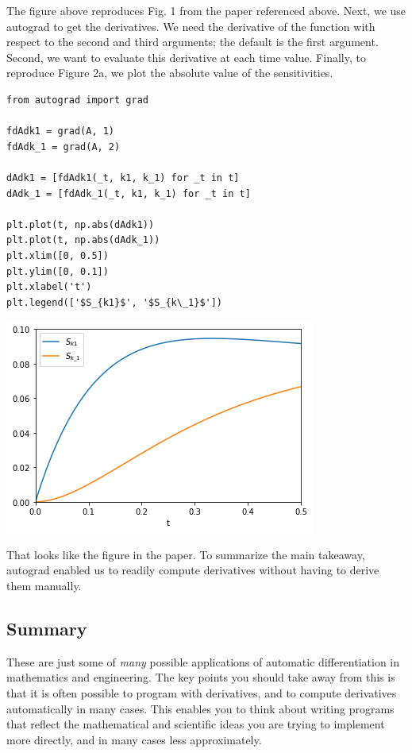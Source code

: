 \documentclass[11pt]{article}
\begin{document}
The figure above reproduces Fig. 1 from the paper referenced above.  Next, we use autograd to get the derivatives. We need the derivative of the function with respect to the second and third arguments; the default is the first argument. Second, we want to evaluate this derivative at each time value.  Finally, to reproduce Figure 2a, we plot the absolute value of the sensitivities.

\begin{verbatim}
from autograd import grad

fdAdk1 = grad(A, 1)
fdAdk_1 = grad(A, 2)

dAdk1 = [fdAdk1(_t, k1, k_1) for _t in t]
dAdk_1 = [fdAdk_1(_t, k1, k_1) for _t in t]

plt.plot(t, np.abs(dAdk1))
plt.plot(t, np.abs(dAdk_1))
plt.xlim([0, 0.5])
plt.ylim([0, 0.1])
plt.xlabel('t')
plt.legend(['$S_{k1}$', '$S_{k\_1}$'])
\end{verbatim}

\begin{center}
\includegraphics[width=.9\linewidth]{obipy-resources/bedd9c33d1d348d762ec8e845109beab-22007Mxe.png}
\end{center}

That looks like the figure in the paper. To summarize the main takeaway, autograd enabled us to readily compute derivatives without having to derive them manually.
\subsection{Summary}
\label{sec:org25d6512}

These are just some of \emph{many} possible applications of automatic differentiation in mathematics and engineering. The key points you should take away from this is that it is often possible to program with derivatives, and to compute derivatives automatically in many cases. This enables you to think about writing programs that reflect the mathematical and scientific ideas you are trying to implement more directly, and in many cases less approximately.
\end{document}
